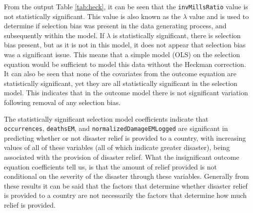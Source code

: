 \documentclass[12pt,letterpaper]{article}
\begin{document}
	From the output Table \ref{tab:heck}, it can be seen that the \texttt{invMillsRatio} value is not statistically significant. This value is also known as the $\lambda$ value and is used to determine if selection bias was present in the data generating process, and subsequently within the model. If $\lambda$ is statistically significant, there is selection bias present, but as it is not in this model, it does not appear that selection bias was a significant issue. This means that a simple model (OLS) on the selection equation would be sufficient to model this data without the Heckman correction. It can also be seen that none of the covariates from the outcome equation are statistically significant, yet they are all statistically significant in the selection model. This indicates that in the outcome model there is not significant variation following removal of any selection bias. 
	
	The statistically significant selection model coefficients indicate that \texttt{occurrences}, \texttt{deathsEM}, and \texttt{normalizedDamageEMLogged} are significant in predicting whether or not disaster relief is provided to a country, with increasing values of all of these variables (all of which indicate greater disaster), being associated with the provision of disaster relief. What the insignificant outcome equation coefficients tell us, is that the amount of relief provided is not conditional on the severity of the disaster through these variables. Generally from these results it can be said that the factors that determine whether disaster relief is provided to a country are not necessarily the factors that determine how much relief is provided.
\end{document}
